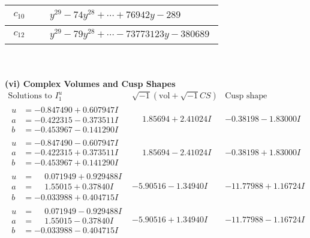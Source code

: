 \documentclass[1p]{elsarticle_modified}
\theoremstyle{definition}
\newcommand{\I}{\sqrt{-1}}
\begin{document}
\begin{tabular}{m{50pt}|m{274pt}}
\hline $$\begin{aligned}c_{10}\end{aligned}$$&$\begin{aligned}
&y^{29}-74 y^{28}+\cdots+76942 y-289
\end{aligned}$\\
\hline $$\begin{aligned}c_{12}\end{aligned}$$&$\begin{aligned}
&y^{29}-79 y^{28}+\cdots-73773123 y-380689
\end{aligned}$\\
\hline
\end{tabular}\\~\\
\newpage\flushleft \textbf{(vi) Complex Volumes and Cusp Shapes}
$$\begin{array}{c|c|c}  
\text{Solutions to }I^u_{1}& \I (\text{vol} + \sqrt{-1}CS) & \text{Cusp shape}\\
 \hline 
\begin{aligned}
u &= -0.847490 + 0.607947 I \\
a &= -0.422315 - 0.373511 I \\
b &= -0.453967 - 0.141290 I\end{aligned}
 & \phantom{-}1.85694 + 2.41024 I & -0.38198 - 1.83000 I \\ \hline\begin{aligned}
u &= -0.847490 - 0.607947 I \\
a &= -0.422315 + 0.373511 I \\
b &= -0.453967 + 0.141290 I\end{aligned}
 & \phantom{-}1.85694 - 2.41024 I & -0.38198 + 1.83000 I \\ \hline\begin{aligned}
u &= \phantom{-}0.071949 + 0.929488 I \\
a &= \phantom{-}1.55015 + 0.37840 I \\
b &= -0.033988 + 0.404715 I\end{aligned}
 & -5.90516 - 1.34940 I & -11.77988 + 1.16724 I \\ \hline\begin{aligned}
u &= \phantom{-}0.071949 - 0.929488 I \\
a &= \phantom{-}1.55015 - 0.37840 I \\
b &= -0.033988 - 0.404715 I\end{aligned}
 & -5.90516 + 1.34940 I & -11.77988 - 1.16724 I \\ \hline\begin{aligned}

\end{aligned}
\end{array}$$
\end{document}
